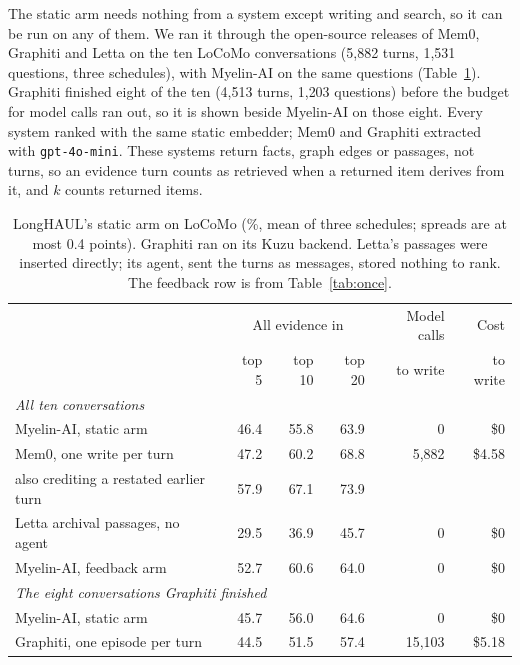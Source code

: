 \documentclass[11pt]{article}
\begin{document}
The static arm needs nothing from a system except writing and search,
so it can be run on any of them. We ran it through the open-source
releases of Mem0, Graphiti and Letta on the ten LoCoMo conversations
(5{,}882 turns, 1{,}531 questions, three schedules), with
\mbox{Myelin-AI} on the same questions (Table~\ref{tab:others}).
Graphiti finished eight of the ten (4{,}513 turns, 1{,}203 questions)
before the budget for model calls ran out, so it is shown beside
\mbox{Myelin-AI} on those eight. Every system ranked with the same
static embedder; Mem0 and Graphiti extracted with
\texttt{gpt-4o-mini}. These systems return facts, graph edges or
passages, not turns, so an evidence turn counts as retrieved when a
returned item derives from it, and $k$ counts returned items.

\begin{table}[t]
\centering
\small
\begin{tabular}{lrrrrr}
\toprule
 & \multicolumn{3}{c}{All evidence in} & Model calls & Cost \\
 & top 5 & top 10 & top 20 & to write & to write \\
\midrule
\multicolumn{6}{l}{\emph{All ten conversations}} \\
\mbox{Myelin-AI}, static arm & 46.4 & 55.8 & 63.9 & 0 & \$0 \\
Mem0, one write per turn & 47.2 & 60.2 & 68.8 & 5{,}882 & \$4.58 \\
\quad also crediting a restated earlier turn & 57.9 & 67.1 & 73.9 & & \\
Letta archival passages, no agent & 29.5 & 36.9 & 45.7 & 0 & \$0 \\
\mbox{Myelin-AI}, feedback arm & 52.7 & 60.6 & 64.0 & 0 & \$0 \\
\midrule
\multicolumn{6}{l}{\emph{The eight conversations Graphiti finished}} \\
\mbox{Myelin-AI}, static arm & 45.7 & 56.0 & 64.6 & 0 & \$0 \\
Graphiti, one episode per turn & 44.5 & 51.5 & 57.4 & 15{,}103 & \$5.18 \\
\bottomrule
\end{tabular}
\caption{LongHAUL's static arm on LoCoMo (\%, mean of three
schedules; spreads are at most 0.4 points). Graphiti ran on its Kuzu
backend. Letta's passages were inserted directly; its agent, sent the
turns as messages, stored nothing to rank. The feedback row is from
Table~\ref{tab:once}.}
\label{tab:others}
\end{table}
\end{document}
